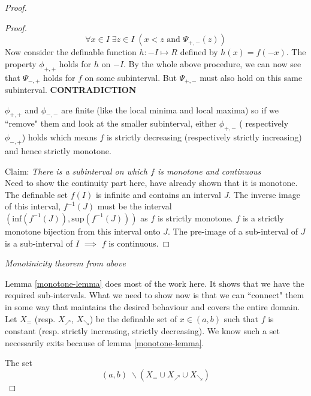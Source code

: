 \begin{proof}
\begin{proof}
        \begin{equation}
        \label{prop2}
            \forall x \in I\; \exists z \in I\; (x < z \text{ and } \Psi_{+, -}(z))
        \end{equation}
        Now consider the definable function $h: -I\mapsto R$ defined by $h(x) = f(-x)$. The property $\phi_{+,+}$ holds for $h$ on $-I$. By the whole above procedure, we can now see that $\Psi_{-,+}$ holds for \textbf{$f$} on some subinterval. But $\Psi_{+,-}$ must also hold on this same subinterval. \textbf{CONTRADICTION}
        \par $\phi_{+,+}$ and $\phi_{-,-}$ are finite (like the local minima and local maxima) so if we ``remove" them and look at the smaller subinterval, either $\phi_{+,-}$ ( respectively $\phi_{-,+}$) holds which means $f$ is strictly decreasing (respectively strictly increasing) and hence strictly monotone.
        \par Claim: \textit{There is a subinterval on which $f$ is monotone and continuous} \\Need to show the continuity part here, have already shown that it is monotone. The definable set $f(I)$ is infinite and contains an interval $J$. The inverse image of this interval, $f^{-1}(J)$ must be the interval $(\text{inf}(f^{-1}(J)), \text{sup}(f^{-1}(J)))$ as $f$ is strictly monotone. $f$ is a strictly monotone bijection from this interval onto $J$. The pre-image of a sub-interval of $J$ is a sub-interval of $I$ $\implies$ $f$ is continuous.
    \end{proof}
    \textit{Monotinicity theorem from above}
    \par Lemma \ref{monotone-lemma} does most of the work here. It shows that we have the required sub-intervals. What we need to show now is that we can ``connect" them in some way that maintains the desired behaviour and covers the entire domain.
    \\ Let $X_{=}$ (resp. $X_\nearrow$, $X_\searrow$) be the definable set of $x\in (a, b)$ such that $f$ is constant (resp. strictly increasing, strictly decreasing). We know such a set necessarily exits because of lemma \ref{monotone-lemma}. \par The set 
    \begin{equation}
    \label{mn-set}
        (a, b) \;\backslash (X_=\cup X_\nearrow \cup X_\searrow)
    \end{equation}

\end{proof}
